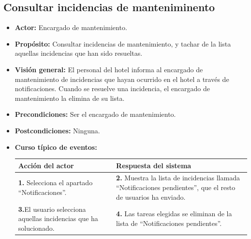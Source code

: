 \documentclass[spanish,a4paper,11pt, twoside]{report}	%
\begin{document}
		\subsection{Consultar incidencias de manteniminento}
			\begin{itemize}
			\item \textbf{Actor: }Encargado de mantenimiento.
			\item \textbf{Propósito: }Consultar incidencias de mantenimiento, y tachar de la
				lista aquellas incidencias que han sido resueltas.
			\item \textbf{Visión general: }El personal del hotel informa al encargado de
				mantenimiento de incidencias que hayan ocurrido en el hotel a través de
				notificaciones. Cuando se resuelve una incidencia, el encargado de mantenimiento
				la elimina de su lista.
			\item \textbf{Precondiciones:} Ser el encargado de mantenimiento.
			\item \textbf{Postcondiciones:} Ninguna.
			\item \textbf{Curso típico de eventos:} \\ 
			\begin{tabular}{|p{6cm}||p{6cm}|}
				\hline
				\textbf{Acción del actor} & \textbf{Respuesta del sistema} \\ \hline \hline
				\textbf{1.} Selecciona el apartado ``Notificaciones''. & 
				\textbf{2.} Muestra la lista de incidencias llamada ``Notificaciones pendientes'',
						 que el resto de usuarios ha enviado.\\ \hline 
				\textbf{3.}El usuario selecciona aquellas incidencias que ha solucionado. & 
				\textbf{4.} Las tareas elegidas se eliminan de la lista de ``Notificaciones pendientes''.\\ \hline
			\end{tabular}
		\end {itemize}
		

	\hspace{1 true cm}	
\end{document}
